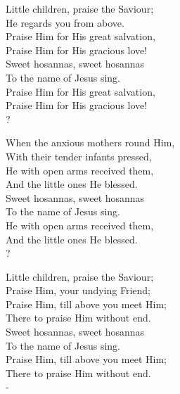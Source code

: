\renewcommand\thepoemmeter{8.7.8.7.D.}
\def\poemvsindentlines{2468}
\setcounter{poemindentevery}{0}
\poem
Little children, praise the Saviour; \\
He regards you from above. \\
Praise Him for His great salvation, \\
Praise Him for His gracious love! \\
Sweet hosannas, sweet hosannas \\
To the name of Jesus sing. \\
Praise Him for His great salvation, \\
Praise Him for His gracious love! \\? \verseendbreak\vspace{1em}\* 

When the anxious mothers round Him, \\
With their tender infants pressed, \\
He with open arms received them, \\
And the little ones He blessed. \\
Sweet hosannas, sweet hosannas \\
To the name of Jesus sing. \\
He with open arms received them, \\
And the little ones He blessed. \\? \verseendbreak\vspace{1em}\* 

Little children, praise the Saviour; \\
Praise Him, your undying Friend; \\
Praise Him, till above you meet Him; \\
There to praise Him without end. \\
Sweet hosannas, sweet hosannas \\
To the name of Jesus sing. \\
Praise Him, till above you meet Him; \\
There to praise Him without end. \\- \verseendbreak

